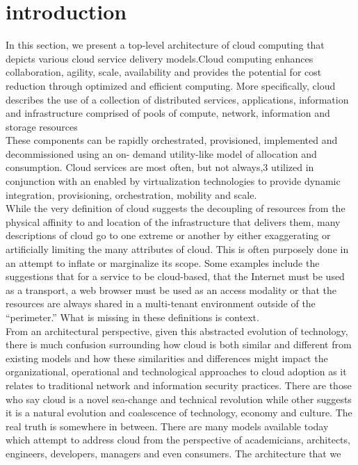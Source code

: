 \documentclass[11pt,a4paper]{report}
\begin{document}
\section{introduction}
In this section, we present a top-level architecture of cloud computing that depicts various cloud service delivery models.Cloud computing enhances collaboration, agility, scale, availability and provides the potential for cost reduction through optimized and efficient computing. More specifically, cloud describes the use of a collection of distributed services, applications, information and infrastructure comprised of pools of compute, network, information and storage resources\\These
components can be rapidly orchestrated, provisioned, implemented and decommissioned using an on-
demand utility-like model of allocation and consumption. Cloud services are most often, but not always,3
utilized in conjunction with an enabled by virtualization technologies to provide dynamic integration,
provisioning, orchestration, mobility and scale.\\
While the very definition of cloud suggests the decoupling of resources from the physical affinity to
and location of the infrastructure that delivers them, many descriptions of cloud go to one extreme or
another by either exaggerating or artificially limiting the many attributes of cloud. This is often purposely
done in an attempt to inflate or marginalize its scope. Some examples include the suggestions that for a
service to be cloud-based, that the Internet must be used as a transport, a web browser must be used as an
access modality or that the resources are always shared in a multi-tenant environment outside of the
“perimeter.” What is missing in these definitions is context.
\\From an architectural perspective, given this abstracted evolution of technology, there is much
confusion surrounding how cloud is both similar and different from existing models and how these
similarities and differences might impact the organizational, operational and technological approaches to
cloud adoption as it relates to traditional network and information security practices. There are those who
say cloud is a novel sea-change and technical revolution while other suggests it is a natural evolution and
coalescence of technology, economy and culture. The real truth is somewhere in between.
There are many models available today which attempt to address cloud from the perspective of
academicians, architects, engineers, developers, managers and even consumers. The architecture that we
\end{document}
